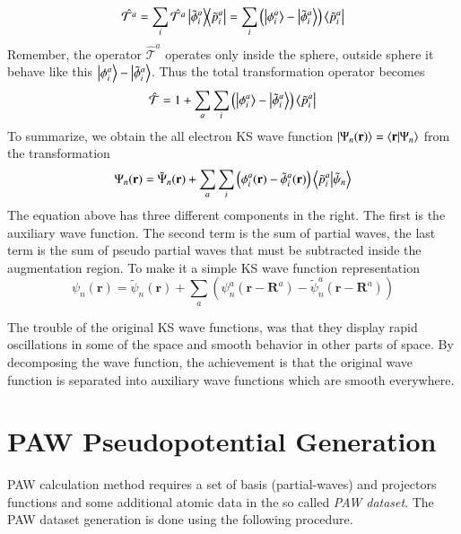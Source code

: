 \begin{equation}
\hat{\mathcal{T}^a} = \sum_i \hat{\mathcal{T}^a} \dyad{\tilde{\phi}_i^a}{\tilde{p}_i^a} = \sum_i \left( \ket{\phi_i^a} -\ket{\tilde{\phi}_i^a} \right) \bra{\tilde{p}_i^a}
\end{equation}
Remember, the operator $\hat{\mathcal{T}}^a$ operates only inside the sphere, outside sphere it behave like this $\ket{\phi_i^a} - \ket{\tilde{\phi}_i^a}$. Thus the total transformation operator becomes
\begin{equation}
\hat{\mathcal{T}} = 1 + \sum_a\sum_i\left( \ket{\phi_i^a} -\ket{\tilde{\phi}_i^a} \right) \bra{\tilde{p}_i^a} 
\end{equation}
To summarize, we obtain the all electron KS wave function $\ket{\Psi_n(\mathbf{r})} = \braket{\mathbf{r}}{\Psi_n}$ from the transformation
\begin{equation}
\label{eq_main_paw}
\Psi_n(\mathbf{r}) = \tilde{\Psi}_n(\mathbf{r}) + \sum_a\sum_i \left (\phi_i^a(\mathbf{r}) - \tilde{\phi}_i^a(\mathbf{r})   \right) \braket{\tilde{p}_i^a}{\tilde{\psi}_n}
\end{equation}
The equation above has three different components in the right. The first is the auxiliary wave function. The second term is the sum of partial waves, the last term is the sum of pseudo partial waves that must be subtracted inside the augmentation region. To make it a simple KS wave function representation
\begin{equation}
\psi_n(\mathbf{r}) = \tilde{\psi}_n(\mathbf{r}) + \sum_a\left( \psi_n^a(\mathbf{r}-\mathbf{R}^a) - \tilde{\psi}_n^a (\mathbf{r} - \mathbf{R}^a) \right)
\end{equation}

The trouble of the original KS wave functions, was that they display rapid oscillations in some of the space and smooth behavior in other parts of space. By decomposing the wave function, the achievement is that the original wave function is separated into auxiliary wave functions which are smooth everywhere.


\section{PAW Pseudopotential Generation}\label{appen_pseudo}
PAW calculation method requires a set of basis (partial-waves) and projectors functions and some additional atomic data in the so called \textit{PAW dataset}. The PAW dataset generation is done using the following procedure.

